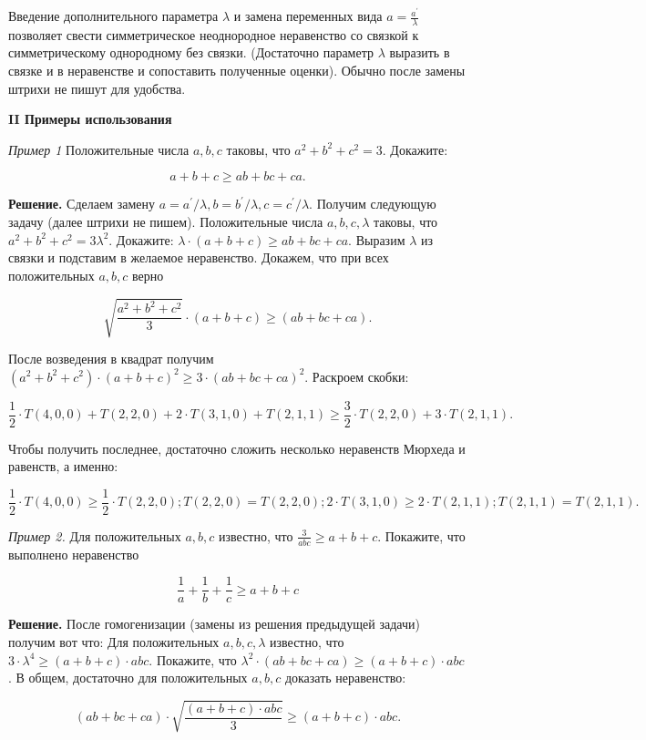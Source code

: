 Введение дополнительного параметра $\lambda$ и замена переменных вида $a=\frac{a^{\prime}}{\lambda}$ позволяет свести симметрическое неоднородное неравенство со связкой к симметрическому однородному без связки. (Достаточно параметр $\lambda$ выразить в связке и в неравенстве и сопоставить полученные оценки). Обычно после замены штрихи не пишут для удобства. 

\textbf{II Примеры использования}

\textit{Пример 1}
Положительные числа $a, b, c$ таковы, что $a^2+b^2+c^2=3$. Докажите:

$$
a+b+c \geqslant a b+b c+c a .
$$


\textbf{Решение.}
Сделаем замену $a=a^{\prime} / \lambda, b=b^{\prime} / \lambda, c=c^{\prime} / \lambda$. Получим следующую задачу (далее штрихи не пишем).
Положительные числа $a, b, c, \lambda$ таковы, что $a^2+b^2+c^2=3 \lambda^2$. Докажите: $\lambda \cdot(a+b+c) \geqslant a b+b c+c a$.
Выразим $\lambda$ из связки и подставим в желаемое неравенство. Докажем, что при всех положительных $a, b, c$ верно

$$
\sqrt{\frac{a^2+b^2+c^2}{3}} \cdot(a+b+c) \geqslant(a b+b c+c a) .
$$


После возведения в квадрат получим $\left(a^2+b^2+c^2\right) \cdot(a+b+c)^2 \geqslant 3 \cdot(a b+b c+c a)^2$. Раскроем скобки:

$$
\frac{1}{2} \cdot T(4,0,0)+T(2,2,0)+2 \cdot T(3,1,0)+T(2,1,1) \geqslant \frac{3}{2} \cdot T(2,2,0)+3 \cdot T(2,1,1) .
$$


Чтобы получить последнее, достаточно сложить несколько неравенств Мюрхеда и равенств, а именно:

$$
\frac{1}{2} \cdot T(4,0,0) \geqslant \frac{1}{2} \cdot T(2,2,0) ; T(2,2,0)=T(2,2,0) ; 2 \cdot T(3,1,0) \geqslant 2 \cdot T(2,1,1) ; T(2,1,1)=T(2,1,1) .
$$

\textit{Пример 2.}
Для положительных $a, b, c$ известно, что $\frac{3}{a b c} \geqslant a+b+c$. Покажите, что выполнено неравенство

$$
\frac{1}{a}+\frac{1}{b}+\frac{1}{c} \geqslant a+b+c
$$

\textbf{Решение.} После гомогенизации (замены из решения предыдущей задачи) получим вот что: Для положительных $a, b, c, \lambda$ известно, что $3 \cdot \lambda^4 \geqslant(a+b+c) \cdot a b c$. Покажите, что $\lambda^2 \cdot(a b+b c+c a) \geqslant(a+b+c) \cdot a b c$. В общем, достаточно для положительных $a, b, c$ доказать неравенство:

$$
(a b+b c+c a) \cdot \sqrt{\frac{(a+b+c) \cdot a b c}{3}} \geqslant(a+b+c) \cdot a b c .
$$

